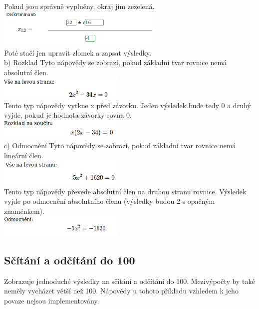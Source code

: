 \documentclass[
]{article}
\begin{document}
Pokud jsou správně vyplněny, okraj jim zezelená.\\
\includegraphics[width=8cm]{../../doc-images/diskriminant3.png}\\
Poté stačí jen upravit zlomek a zapsat výsledky.\\
b) Rozklad Tyto nápovědy se zobrazí, pokud
základní tvar rovnice nemá absolutní člen.\\
\includegraphics[width=6cm]{../../doc-images/rozklad1.png}\\
Tento typ nápovědy vytkne x
před závorku. Jeden výsledek bude tedy 0 a druhý vyjde, pokud je hodnota
závorky rovna 0.\\
\includegraphics[width=6cm]{../../doc-images/rozklad2.png}\\
c) Odmocnění
Tyto nápovědy se zobrazí, pokud základní tvar rovnice nemá lineární
člen.\\
\includegraphics[width=6cm]{../../doc-images/odmocneni1.png}\\
Tento typ nápovědy
převede absolutní člen na druhou stranu rovnice. Výsledek vyjde po
odmocnění absolutního členu (výsledky budou 2 s opačným znaménkem).\\
\includegraphics[width=6cm]{../../doc-images/odmocneni2.png}\\

\subsection{Sčítání a odčítání do 100}

Zobrazuje jednoduché výsledky na sčítání a odčítání do 100. Mezivýpočty
by také neměly vycházet větší než 100. Nápovědy u tohoto příkladu
vzhledem k jeho povaze nejsou implementovány.
\end{document}
